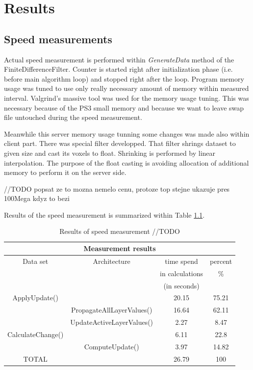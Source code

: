 \chapter{Results}

\section{Speed measurements}

\par
Actual speed measurement is performed within \emph{GenerateData} method of the FiniteDifferenceFilter.
Counter is started right after initialization phase (i.e. before main algorithm loop) and stopped right after the loop.
Program memory usage was tuned to use only really necessary amount of memory within measured interval.
Valgrind's massive tool was used for the memory usage tuning.
This was necessary because of the PS3 small memory and because we want to leave swap file untouched during the speed measurement.

\par
Meanwhile this server memory usage tunning some changes was made also within client part.
There was special filter developped.
That filter shrings dataset to given size and cast its voxels to float.
Shrinking is performed by linear interpolation.
The purpose of the float casting is avoiding allocation of additional memory to perform it on the server side.

//TODO popsat ze to mozna nemelo cenu, protoze top stejne ukazuje pres 100Mega kdyz to bezi
\par
Results of the speed measurement is summarized within Table \ref{tab:runresults}.

\begin{table}
\centering
\begin{tabular}{|c|c|c|c|}
\hline
\multicolumn{4}{|c|}{Measurement results}\\
\hline
Data set&Architecture&time spend&percent\\&&in calculations&\%\\&&(in seconds)&\\
\hline
\hline
ApplyUpdate()	&				&	20.15&	75.21\\
\hline
		&PropagateAllLayerValues()	&	16.64&	62.11\\
\hline
		&UpdateActiveLayerValues()	&	2.27&	8.47\\
\hline
CalculateChange()&				&	6.11&	22.8\\
\hline
		&ComputeUpdate()		&	3.97&	14.82\\
\hline
TOTAL		&				&	26.79&	100\\
\hline
\end{tabular}
\par
\caption[Measurement results]
{
  Results of speed measurement //TODO
}
\label{tab:runresults}
\end{table}

